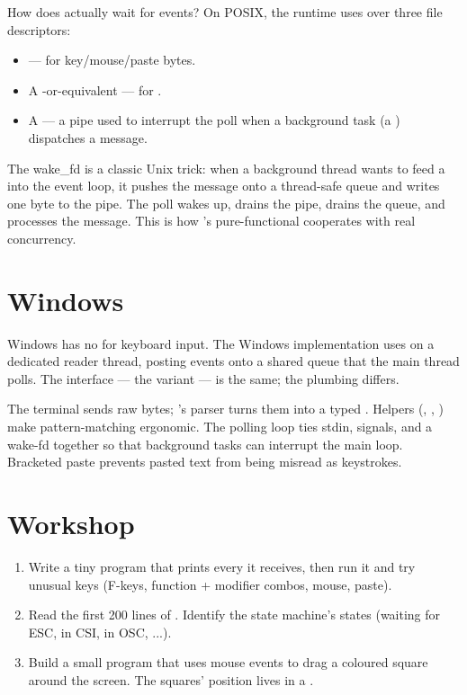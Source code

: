 How does \maya{} actually wait for events? On POSIX, the runtime
uses  over three file descriptors:

\begin{itemize}[leftmargin=*]
  \item {} --- for key/mouse/paste bytes.
  \item A -or-equivalent --- for .
  \item A  --- a pipe used to interrupt the poll
    when a background task (a ) dispatches a
    message.
\end{itemize}

The wake\_fd is a classic Unix trick: when a background thread
wants to feed a  into the event loop, it pushes the
message onto a thread-safe queue and writes one byte to the pipe.
The poll wakes up, drains the pipe, drains the queue, and
processes the message. This is how \maya{}'s pure-functional
 cooperates with real concurrency.

\section{Windows}

Windows has no  for keyboard input. The Windows
implementation uses  on a dedicated reader
thread, posting events onto a shared queue that the main thread
polls. The interface --- the  variant --- is the
same; the plumbing differs.

\begin{recap}
The terminal sends raw bytes; \maya{}'s parser turns them into a
typed .
Helpers (, , ) make pattern-matching
ergonomic. The polling loop ties stdin, signals, and a wake-fd
together so that background tasks can interrupt the main loop.
Bracketed paste prevents pasted text from being misread as
keystrokes.
\end{recap}

\section*{Workshop}

\begin{enumerate}[leftmargin=*]
  \item Write a tiny program that prints every  it
    receives, then run it and try unusual keys (F-keys, function
    + modifier combos, mouse, paste).
  \item Read the first 200 lines of .
    Identify the state machine's states (waiting for ESC, in CSI,
    in OSC, ...).
  \item Build a small program that uses mouse events to drag a
    coloured square around the screen. The squares' position
    lives in a .
\end{enumerate}
